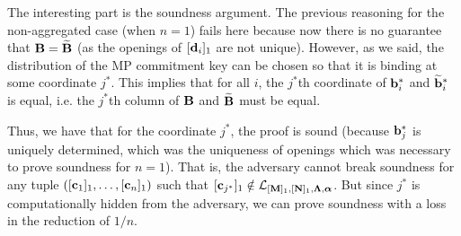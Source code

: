 The interesting part is the soundness argument. The previous reasoning for the non-aggregated case (when $n=1$) fails here because now there is no guarantee that 
 $\mathbf{{B}}=\widetilde{\mathbf{{B}}}$ (as the openings of $[\mathbf{d}_i]_1$ are not unique).  However, as we said, the distribution of the MP commitment key can be chosen so that it is binding at some coordinate $j^*$. This implies that for all $i$, the $j^*$th coordinate of $\mathbf{b}_i^*$ and $\widetilde{\mathbf{b}}_i^*$ is equal, i.e. the $j^*$th column of $\mathbf{{B}}$ and $\widetilde{\mathbf{{B}}}$ must be equal.  

Thus, we have that for the coordinate $j^*$, the proof is sound (because $\mathbf{b}_j^*$ is uniquely determined, which was the uniqueness of openings which was necessary to prove soundness for $n=1$). That is, the adversary cannot break soundness for any tuple $([\mathbf{c}_1]_1,\ldots, [\mathbf{c}_n]_1)$ such that $[\mathbf{c}_{j^*}]_1 \notin \mathcal{L}_{[\mathbf{{M}}]_1,[\mathbf{{N}}]_1,\mathbf{{\Lambda}},{\boldsymbol \alpha}}$. But since $j^*$ is computationally hidden 
from the adversary, we can prove soundness with a loss in the reduction of $1/n$. 



